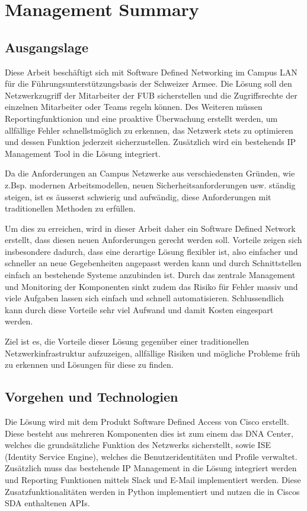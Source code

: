 \section{Management Summary}

\subsection{Ausgangslage}
Diese Arbeit beschäftigt sich mit Software Defined Networking im Campus LAN für die Führungsunterstützungsbasis der Schweizer Armee. Die Lösung soll den Netzwerkzugriff der Mitarbeiter der FUB sicherstellen und die Zugriffsrechte der einzelnen Mitarbeiter oder Teams regeln können. 
Des Weiteren müssen Reportingfunktionion und eine proaktive Überwachung erstellt werden, um allfällige Fehler schnellstmöglich zu erkennen, das Netzwerk stets zu optimieren und dessen Funktion jederzeit sicherzustellen.
Zusätzlich wird ein bestehends IP Management Tool in die Lösung integriert.

Da die Anforderungen an Campus Netzwerke aus verschiedensten Gründen, wie z.Bsp. modernen Arbeitsmodellen, neuen Sicherheitsanforderungen usw. ständig steigen, ist es äusserst schwierig und aufwändig, diese Anforderungen mit traditionellen Methoden zu erfüllen. 

Um dies zu erreichen, wird in dieser Arbeit daher ein Software Defined Network erstellt, dass diesen neuen Anforderungen gerecht werden soll. Vorteile zeigen sich insbesondere dadurch, dass eine derartige Lösung flexibler ist, also einfacher und schneller an neue Gegebenheiten angepasst werden kann und durch Schnittstellen einfach an bestehende Systeme anzubinden ist. Durch das zentrale Management und Monitoring der Komponenten sinkt zudem das Risiko für Fehler massiv und viele Aufgaben lassen sich einfach und schnell automatisieren.
Schlussendlich kann durch diese Vorteile sehr viel Aufwand und damit Kosten eingespart werden.

Ziel ist es, die Vorteile dieser Lösung gegenüber einer traditionellen Netzwerkinfrastruktur aufzuzeigen, allfällige Risiken und mögliche Probleme früh zu erkennen und Lösungen für diese zu finden. 
\subsection{Vorgehen und Technologien}
Die Lösung wird mit dem Produkt Software Defined Access von Cisco erstellt. Diese besteht aus mehreren Komponenten dies ist zum einem das DNA Center, welches die grundsätzliche Funktion des Netzwerks sicherstellt, sowie ISE (Identity Service Engine), welches die Benutzeridentitäten und Profile verwaltet.
Zusätzlich muss das bestehende IP Management in die Lösung integriert werden und Reporting Funktionen mittels Slack und E-Mail implementiert werden. Diese Zusatzfunktionalitäten werden in Python implementiert und nutzen die in Ciscos SDA enthaltenen APIs.
